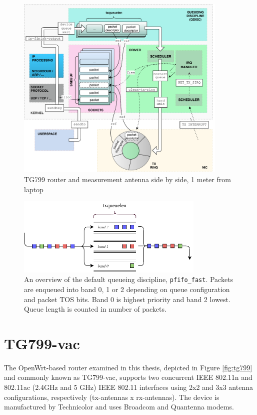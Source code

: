 \begin{figure}
\center
\includegraphics[width=0.9\textwidth]{images/linux-egress-overview.pdf}
\caption{TG799 router and measurement antenna side by side, 1 meter from laptop}
\label{fig:linux_egress}
\end{figure}

\begin{figure}
\center
\includegraphics[width=0.8\textwidth]{images/pfifo-fast-queue.pdf}
\caption{An overview of the default queueing discipline, \texttt{pfifo\_fast}. Packets are enqueued into band 0, 1 or 2 depending on queue configuration and packet TOS bits. Band 0 is highest priority and band 2 lowest. Queue length is counted in number of packets.}
\label{fig:pfifofast}
\end{figure}

\section{TG799-vac}

The OpenWrt-based router examined in this thesis, depicted in Figure
\ref{fig:tg799} and commonly known as TG799-vac, supports two concurrent IEEE
802.11n and 802.11ac (2.4GHz and 5 GHz) IEEE 802.11 interfaces using 2x2 and
3x3 antenna configurations, respectively (tx-antennas x rx-antennas).  The
device is manufactured by Technicolor and uses Broadcom and Quantenna modems.


